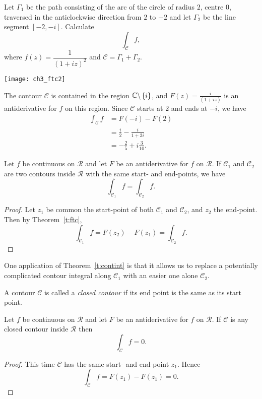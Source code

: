\begin{example}
Let $\Gamma_1$ be the path consisting of the arc of the circle of radius $2$, centre $0$, traversed in the anticlockwise direction from $2$ to $-2$ and let $\Gamma_2$ be the line segment $[-2,-i]$.  Calculate
\[
\int_{\mathcal{C}} f,
\]
where $f(z) = \dfrac{1}{(1+iz)^2}$ and $\mathcal{C} = \Gamma_1+ \Gamma_2$.
\end{example}
\begin{solution}
\begin{center}
\texttt{[image: ch3\_ftc2]}
\end{center}
The contour $\mathcal{C}$ is contained in the region $\mathbb{C} \backslash \left\{i\right\}$, and $F(z) = \frac{i}{(1+iz)}$ is an antiderivative for $f$ on this region.  Since $\mathcal{C}$ starts at $2$ and ends at $-i$, we have
\begin{align*}
\int_{\mathcal{C}} f & = F(-i)-F(2) \\
& = \frac{i}{2} - \frac{i}{1+2i} \\
& = - \frac{2}{5} +i \frac{3}{10}.
\end{align*}
\end{solution}
\begin{theorem}
\label{t:contint}
Let $f$ be continuous on $\mathcal{R}$ and let $F$ be an antiderivative for $f$ on $\mathcal{R}$.  If $\mathcal{C}_1$ and $\mathcal{C}_2$ are two contours inside $\mathcal{R}$ with the same start- and end-points, we have
\[
\int_{\mathcal{C}_1} f = \int_{\mathcal{C}_2} f.
\]
\end{theorem}
\begin{proof}
Let $z_1$ be common the start-point of both $\mathcal{C}_1$ and $\mathcal{C}_2$, and $z_2$ the end-point.  Then by Theorem~\ref{t:ftc},
\[
\int_{\mathcal{C}_1} f = F(z_2)-F(z_1) = \int_{\mathcal{C}_2} f.
\]
\end{proof}
One application of Theorem~\ref{t:contint} is that it allows us to replace a potentially complicated contour integral along $\mathcal{C}_1$ with an easier one alone $\mathcal{C}_2$.

\begin{definition}
A contour $\mathcal{C}$ is called a \emph{closed contour} if its end point is the same as its start point.
\end{definition}
\begin{theorem}
\label{t:closed}
Let $f$ be continuous on $\mathcal{R}$ and let $F$ be an antiderivative for $f$ on $\mathcal{R}$.  If $\mathcal{C}$ is any closed contour inside $\mathcal{R}$ then
\[
\int_{\mathcal{C}} f = 0.
\]
\end{theorem}
\begin{proof}
This time $\mathcal{C}$ has the same start- and end-point $z_1$.  Hence
\[
\int_{\mathcal{C}} f = F(z_1)-F(z_1) = 0.
\]
\end{proof}


